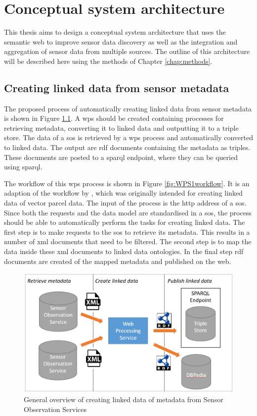 

\chapter{Conceptual system architecture}
\label{chap:design}

This thesis aims to design a conceptual system architecture that uses the semantic web to improve sensor data discovery as well as the integration and aggregation of sensor data from multiple sources. The outline of this architecture will be described here using the methods of Chapter \ref{chap:methods}. 

\section{Creating linked data from sensor metadata}
\label{par:Architecture1}
The proposed process of automatically creating linked data from sensor metadata is shown in Figure \ref{fig:WPS1}. A \acf{wps} should be created containing processes for retrieving metadata, converting it to linked data and outputting it to a triple store. The data of a \ac{sos} is retrieved by a \ac{wps} process and automatically converted to linked data. The output are \ac{rdf} documents containing the metadata as triples. These documents are posted to a \ac{sparql} endpoint, where they can be queried using \ac{sparql}.  

The workflow of this \ac{wps} process is shown in Figure \ref{fig:WPS1workflow}. It is an adaption of the workflow by \cite{LD:Missier}, which was originally intended for creating linked data of vector parcel data. The input of the process is the \ac{http} address of a \ac{sos}. Since both the requests and the data model are standardised in a \ac{sos}, the process should be able to automatically perform the tasks for creating linked data. The first step is to make requests to the \ac{sos} to retrieve its metadata. This results in a number of \ac{xml} documents that need to be filtered. The second step is to map the data inside these \ac{xml} documents to linked data ontologies. In the final step \ac{rdf} documents are created of the mapped metadata and published on the web.  

\begin{figure}
	\centering
	\includegraphics[width=0.8\linewidth]{UML/wps1diagram2.PNG}
	\caption{General overview of creating linked data of metadata from Sensor Observation Services}
	\label{fig:WPS1}
\end{figure}

